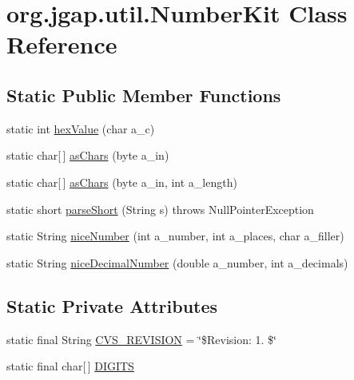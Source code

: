 \hypertarget{classorg_1_1jgap_1_1util_1_1_number_kit}{\section{org.\-jgap.\-util.\-Number\-Kit Class Reference}
\label{classorg_1_1jgap_1_1util_1_1_number_kit}
}
\subsection*{Static Public Member Functions}
\begin{DoxyCompactItemize}
\item 
static int \hyperlink{classorg_1_1jgap_1_1util_1_1_number_kit_ae612459e7dddc5b3f092a85f36c40abe}{hex\-Value} (char a\-\_\-c)
\item 
static char\mbox{[}$\,$\mbox{]} \hyperlink{classorg_1_1jgap_1_1util_1_1_number_kit_adde88680d33f7440a753c1374b78e4ca}{as\-Chars} (byte a\-\_\-in)
\item 
static char\mbox{[}$\,$\mbox{]} \hyperlink{classorg_1_1jgap_1_1util_1_1_number_kit_a59be11b098263002d708fe631033a5b7}{as\-Chars} (byte a\-\_\-in, int a\-\_\-length)
\item 
static short \hyperlink{classorg_1_1jgap_1_1util_1_1_number_kit_a4730d57f2cd46cc7aa3a5e9df75aae2a}{parse\-Short} (String s)  throws Null\-Pointer\-Exception 
\item 
static String \hyperlink{classorg_1_1jgap_1_1util_1_1_number_kit_ab5279faf1199093e136119fcf74b993c}{nice\-Number} (int a\-\_\-number, int a\-\_\-places, char a\-\_\-filler)
\item 
static String \hyperlink{classorg_1_1jgap_1_1util_1_1_number_kit_abc4f54ebbe7c8976f28b87c3efc2bcf0}{nice\-Decimal\-Number} (double a\-\_\-number, int a\-\_\-decimals)
\end{DoxyCompactItemize}
\subsection*{Static Private Attributes}
\begin{DoxyCompactItemize}
\item 
static final String \hyperlink{classorg_1_1jgap_1_1util_1_1_number_kit_a1071e9c45e560423d3a154529438f130}{C\-V\-S\-\_\-\-R\-E\-V\-I\-S\-I\-O\-N} = \char`\"{}\$Revision\-: 1. \$\char`\"{}
\item 
static final char\mbox{[}$\,$\mbox{]} \hyperlink{classorg_1_1jgap_1_1util_1_1_number_kit_aa884d66408e1c4589dfa2badaa233d0e}{D\-I\-G\-I\-T\-S}
\end{DoxyCompactItemize}


